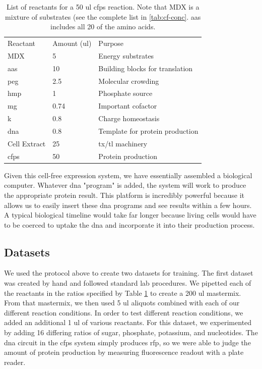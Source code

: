 
\begin{table}[]
\centering
\caption{List of reactants for a 50 \gls{ul} \gls{cfps} reaction. 
Note that MDX is a mixture of substrates (see the complete list in \ref{tab:cf-conc}.
\glspl{aa} includes all 20 of the amino acids.}
\label{tab:cf-nrg}
\begin{tabular}{lll}
Reactant     & Amount (\gls{ul}) & Purpose                         \\
MDX          & 5               & Energy substrates               \\
\glspl{aa}          & 10              & Building blocks for translation \\
\gls{peg}          & 2.5             & Molecular crowding              \\
\gls{hmp}          & 1               & Phosphate source                \\
\gls{mg}           & 0.74            & Important cofactor              \\
\gls{k}            & 0.8             & Charge homeostasis              \\
\gls{dna}          & 0.8             & Template for protein production  \\
Cell Extract & 25              & \gls{tx}/\gls{tl} machinery                 \\ \hline
\gls{cfps}         & 50              & Protein production             
\end{tabular}
\end{table}

Given this cell-free expression system, we have essentially assembled a biological computer.
Whatever \gls{dna} "program" is added, the system will work to produce the appropriate protein result.
This platform is incredibly powerful because it allows us to easily insert these \gls{dna} programs and see results within a few hours.
A typical biological timeline would take far longer because living cells would have to be coerced to uptake the \gls{dna} and incorporate it into their production process.


\subsection{Datasets}
We used the protocol above to create two datasets for training.
The first dataset was created by hand and followed standard lab procedures.
We pipetted each of the reactants in the ratios specified by Table \ref{tab:cf-nrg} to create a 200 \gls{ul} mastermix. 
From that mastermix, we then used 5 \gls{ul} aliquots combined with each of our different reaction conditions.
In order to test different reaction conditions, we added an additional 1 \gls{ul} of various reactants.
For this dataset, we experimented by adding 16 differing ratios of sugar, phosphate, potassium, and nucleotides.
The \gls{dna} circuit in the \gls{cfps} system simply produces \gls{rfp}, so we were able to judge the amount of protein production by measuring fluorescence readout with a plate reader.

